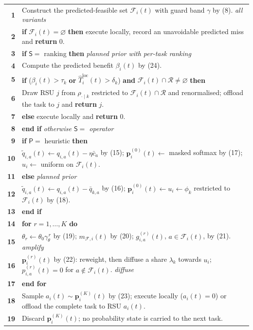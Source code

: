 \documentclass[10pt]{article}
\newcommand{\lnum}[1]{\textbf{#1}}
\newcommand{\cmt}[1]{\hfill{\itshape\footnotesize #1}}
\begin{document}
\vspace{4pt}
\small
\begin{tabularx}{\textwidth}{N Y}
\lnum{1} & Construct the predicted-feasible set $\mathcal F_i(t)$ with guard band $\gamma$ by (8). \cmt{all variants} \\
\lnum{2} & \textbf{if} $\mathcal F_i(t)=\varnothing$ \textbf{then} execute locally, record an unavoidable predicted miss and \textbf{return} $0$. \\
\lnum{3} & \textbf{if} $\mathsf S=$ ranking \textbf{then} \cmt{planned prior with per-task ranking} \\
\lnum{4} & \quad Compute the predicted benefit $\beta_i(t)$ by (24). \\
\lnum{5} & \quad \textbf{if} ($\beta_i(t)>\tau_k$ \textbf{or} $\hat T^{\mathrm{loc}}_i(t)>\delta_k$) \textbf{and} $\mathcal F_i(t)\cap\mathcal R\neq\varnothing$ \textbf{then} \\
\lnum{6} & \quad\quad Draw RSU $j$ from $\rho_{\cdot\mid k}$ restricted to $\mathcal F_i(t)\cap\mathcal R$ and renormalised; offload the task to $j$ and \textbf{return} $j$. \\
\lnum{7} & \quad \textbf{else} execute locally and \textbf{return} $0$. \\
\lnum{8} & \textbf{end if} \cmt{otherwise $\mathsf S=$ operator} \\
\lnum{9} & \textbf{if} $\mathsf P=$ heuristic \textbf{then} \\
\lnum{10} & \quad $\tilde q_{i,a}(t)\gets q_{i,a}(t)-\eta\bar c_a$ by (15); $\mathbf p^{(0)}_i(t)\gets$ masked softmax by (17); $u_i\gets$ uniform on $\mathcal F_i(t)$. \\
\lnum{11} & \textbf{else} \cmt{planned prior} \\
\lnum{12} & \quad $\tilde q_{i,a}(t)\gets q_{i,a}(t)-\bar q_{k,a}$ by (16); $\mathbf p^{(0)}_i(t)\gets u_i\gets\phi_k$ restricted to $\mathcal F_i(t)$ by (18). \\
\lnum{13} & \textbf{end if} \\
\lnum{14} & \textbf{for} $r=1,\ldots,K$ \textbf{do} \\
\lnum{15} & \quad $\theta_r\gets\theta_0\gamma_\theta^{\,r}$ by (19); $m_{\mathcal F,i}(t)$ by (20); $g^{(r)}_{i,a}(t)$, $a\in\mathcal F_i(t)$, by (21). \cmt{amplify} \\
\lnum{16} & \quad $\mathbf p^{(r)}_i(t)$ by (22): reweight, then diffuse a share $\lambda_k$ towards $u_i$; $p^{(r)}_{i,a}(t)=0$ for $a\notin\mathcal F_i(t)$. \cmt{diffuse} \\
\lnum{17} & \textbf{end for} \\
\lnum{18} & Sample $a_i(t)\sim\mathbf p^{(K)}_i(t)$ by (23); execute locally ($a_i(t)=0$) or offload the complete task to RSU $a_i(t)$. \\
\lnum{19} & Discard $\mathbf p^{(K)}_i(t)$; no probability state is carried to the next task. \\
\end{tabularx}
\end{document}
